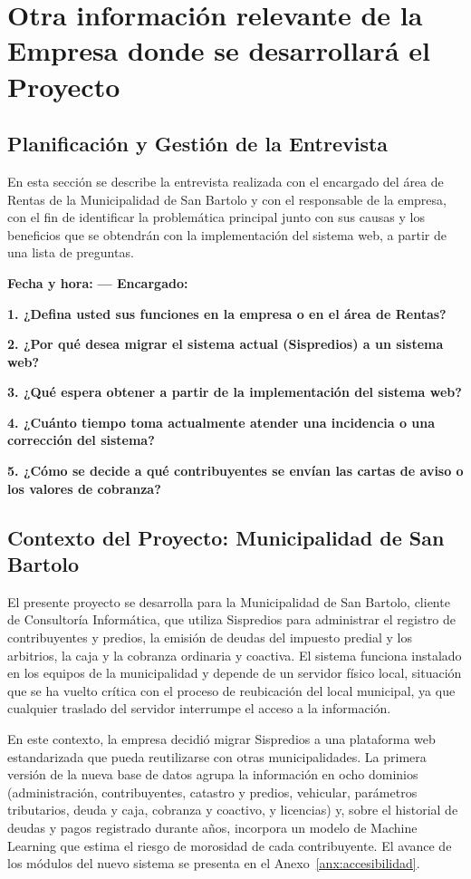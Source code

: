 \documentclass[12pt,a4paper]{report}
\begin{document}
\section{Otra información relevante de la Empresa donde se desarrollará el Proyecto}

\subsection{Planificación y Gestión de la Entrevista}
En esta sección se describe la entrevista realizada con el encargado del área de Rentas de la Municipalidad de San Bartolo y con el responsable de la empresa, con el fin de identificar la problemática principal junto con sus causas y los beneficios que se obtendrán con la implementación del sistema web, a partir de una lista de preguntas.

\noindent\textbf{Fecha y hora:} \textbf{--- Encargado:}

\noindent\textbf{1. ¿Defina usted sus funciones en la empresa o en el área de Rentas?}

\noindent\textbf{2. ¿Por qué desea migrar el sistema actual (Sispredios) a un sistema web?}

\noindent\textbf{3. ¿Qué espera obtener a partir de la implementación del sistema web?}

\noindent\textbf{4. ¿Cuánto tiempo toma actualmente atender una incidencia o una corrección del sistema?}

\noindent\textbf{5. ¿Cómo se decide a qué contribuyentes se envían las cartas de aviso o los valores de cobranza?}

\subsection{Contexto del Proyecto: Municipalidad de San Bartolo}
El presente proyecto se desarrolla para la Municipalidad de San Bartolo, cliente de Consultoría Informática, que utiliza Sispredios para administrar el registro de contribuyentes y predios, la emisión de deudas del impuesto predial y los arbitrios, la caja y la cobranza ordinaria y coactiva. El sistema funciona instalado en los equipos de la municipalidad y depende de un servidor físico local, situación que se ha vuelto crítica con el proceso de reubicación del local municipal, ya que cualquier traslado del servidor interrumpe el acceso a la información.

En este contexto, la empresa decidió migrar Sispredios a una plataforma web estandarizada que pueda reutilizarse con otras municipalidades. La primera versión de la nueva base de datos agrupa la información en ocho dominios (administración, contribuyentes, catastro y predios, vehicular, parámetros tributarios, deuda y caja, cobranza y coactivo, y licencias) y, sobre el historial de deudas y pagos registrado durante años, incorpora un modelo de Machine Learning que estima el riesgo de morosidad de cada contribuyente. El avance de los módulos del nuevo sistema se presenta en el Anexo~\ref{anx:accesibilidad}.
\end{document}

